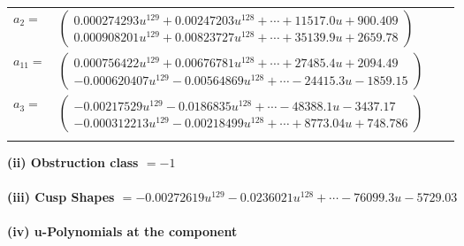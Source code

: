 \documentclass[1p]{elsarticle_modified}
\theoremstyle{definition}
\begin{document}
\begin{tabular}{m{7pt} m{180pt} m{7pt} m{180pt} }
\flushright $a_{2}=$&$\begin{pmatrix}0.000274293 u^{129}+0.00247203 u^{128}+\cdots+11517.0 u+900.409\\0.000908201 u^{129}+0.00823727 u^{128}+\cdots+35139.9 u+2659.78\end{pmatrix}$ \\
\flushright $a_{11}=$&$\begin{pmatrix}0.000756422 u^{129}+0.00676781 u^{128}+\cdots+27485.4 u+2094.49\\-0.000620407 u^{129}-0.00564869 u^{128}+\cdots-24415.3 u-1859.15\end{pmatrix}$ \\
\flushright $a_{3}=$&$\begin{pmatrix}-0.00217529 u^{129}-0.0186835 u^{128}+\cdots-48388.1 u-3437.17\\-0.000312213 u^{129}-0.00218499 u^{128}+\cdots+8773.04 u+748.786\end{pmatrix}$\\&\end{tabular}
\flushleft \textbf{(ii) Obstruction class $= -1$}\\~\\
\flushleft \textbf{(iii) Cusp Shapes $= -0.00272619 u^{129}-0.0236021 u^{128}+\cdots-76099.3 u-5729.03$}\\~\\
\newpage\renewcommand{\arraystretch}{1}
\flushleft \textbf{(iv) u-Polynomials at the component}\newline \\
\end{document}
